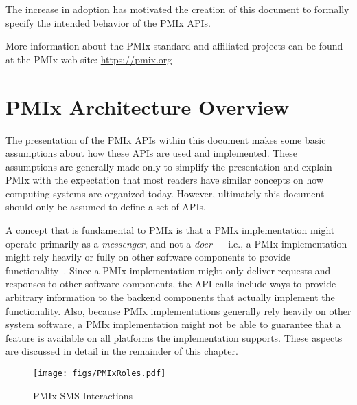 The increase in adoption has motivated the creation of this document to formally specify the intended behavior of the \ac{PMIx} \acp{API}.

More information about the \ac{PMIx} standard and affiliated projects can be found at the \ac{PMIx} web site: \url{https://pmix.org}

\section{PMIx Architecture Overview}
\label{chap:intro:arch_overview}

The presentation of the \ac{PMIx} \acp{API} within this document makes some
basic assumptions about how these \acp{API}
are used and implemented.  These assumptions are generally made only to simplify
the presentation and explain \ac{PMIx} with the expectation that most readers
have similar concepts on how computing systems are organized today.  However, ultimately
this document should only be assumed to define a set of \acp{API}.

A concept that is fundamental to \ac{PMIx} is that a \ac{PMIx} implementation might
operate primarily as a \textit{messenger}, and not a \textit{doer} --- i.e., a \ac{PMIx}
implementation might rely heavily or fully on other software components to provide
functionality~\cite{2017-Castain-EuroMPI}.
Since a \ac{PMIx} implementation might only deliver requests and responses to other
software components, the \ac{API} calls include ways to provide arbitrary information to the
backend components that actually
implement the functionality.  Also, because \ac{PMIx} implementations generally rely heavily
on other system software, a PMIx implementation might not be able to guarantee that a feature
is available on all platforms the implementation supports.  These aspects are discussed in
detail in the remainder of this chapter.

\begingroup
\begin{figure*}[ht!]
  \begin{center}
    \texttt{[image: figs/PMIxRoles.pdf]}
  \end{center}
  \caption{PMIx-SMS Interactions}
  \label{fig:roles}
\end{figure*}
\endgroup


